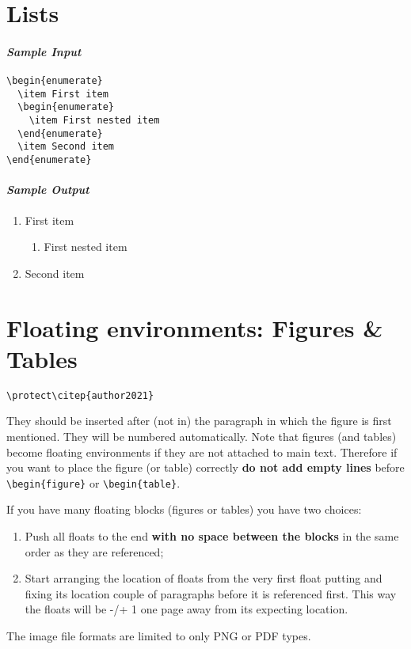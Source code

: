 \documentclass[usenatbib]{tjaa}
\begin{document}
\section{Lists}

\paragraph*{\itshape Sample Input}
\begin{verbatim}
\begin{enumerate}
  \item First item
  \begin{enumerate}
    \item First nested item
  \end{enumerate}
  \item Second item
\end{enumerate}
\end{verbatim}
\paragraph*{\itshape Sample Output}
\begin{enumerate}
  \item First item
  \begin{enumerate}
    \item First nested item
  \end{enumerate}
  \item Second item
\end{enumerate}

\newpage
\section{Floating environments: Figures \& Tables}
\begin{lrbox}{\verbbox}
\verb|\protect\citep{author2021}|
\end{lrbox}

They should be inserted after (not in) the  paragraph in which the figure is
first mentioned.
They will be numbered automatically.
Note that figures (and tables) become floating environments if they are not
attached to main text.
Therefore if you want to place the figure (or table) correctly
\textbf{do not add empty lines} before \verb|\begin{figure}| or
\verb|\begin{table}|.

If you have many floating blocks (figures or tables) you have two choices:
\begin{enumerate}
\item
Push all floats to the end \textbf{with no space between the blocks} in the
same order as they are referenced;
\item
Start arranging the location of floats from the very first float putting and
fixing its location couple of paragraphs before it is referenced first. This
way the floats will be -/+ 1 one page away from its expecting location.
\end{enumerate}
The image file formats are limited to only PNG or PDF types.
\end{document}
